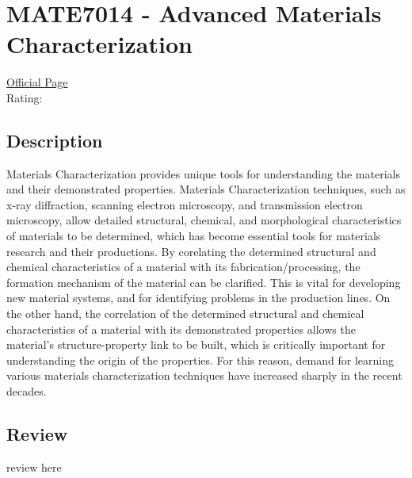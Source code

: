 \hypertarget{MATE7014}{\section{MATE7014 - Advanced Materials Characterization}}

\large
\textcolor{turbo_purple}{\href{https://my.uq.edu.au/programs-courses/course.html?course_code=MATE7014}{Official Page}} \\
Rating: \cstar\cstar\cstar\cstar\ostar

\normalsize
\subsection*{Description}
Materials Characterization provides unique tools for understanding the materials and their demonstrated properties.
Materials Characterization techniques, such as x-ray diffraction, scanning electron microscopy, and transmission electron microscopy, allow detailed structural, chemical, and morphological characteristics of materials to be determined, which has become essential tools for materials research and their productions.
By corelating the determined structural and chemical characteristics of a material with its fabrication/processing, the formation mechanism of the material can be clarified.
This is vital for developing new material systems, and for identifying problems in the production lines.
On the other hand, the correlation of the determined structural and chemical characteristics of a material with its demonstrated properties allows the material's structure-property link to be built, which is critically important for understanding the origin of the properties.
For this reason, demand for learning various materials characterization techniques have increased sharply in the recent decades.

\subsection*{Review}
review here
